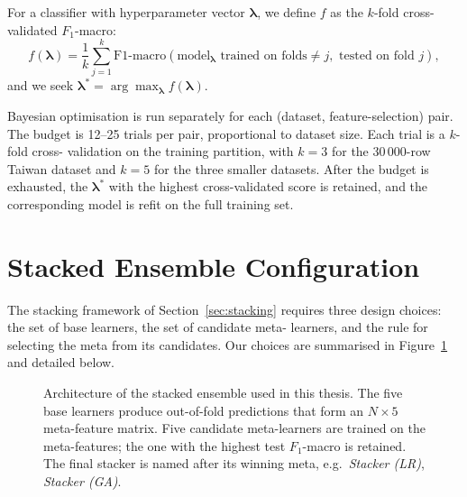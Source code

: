 For a classifier with hyperparameter vector $\boldsymbol{\lambda}$,
we define $f$ as the $k$-fold cross-validated $F_1$-macro:
\begin{equation}
f(\boldsymbol{\lambda})
=
\frac{1}{k}
\sum_{j=1}^{k}
\text{F1-macro}\!\left(
\text{model}_{\boldsymbol{\lambda}}\text{ trained on folds}\neq j,
\text{ tested on fold }j
\right),
\tag{3.6}
\label{eq:bo-objective}
\end{equation}
and we seek $\boldsymbol{\lambda}^{*}=\arg\max_{\boldsymbol{\lambda}} f(\boldsymbol{\lambda})$.

Bayesian optimisation is run separately for each (dataset,
feature-selection) pair. The budget is 12--25 trials per pair,
proportional to dataset size. Each trial is a $k$-fold cross-
validation on the training partition, with $k=3$ for the
30\,000-row Taiwan dataset and $k=5$ for the three smaller
datasets. After the budget is exhausted, the
$\boldsymbol{\lambda}^{*}$ with the highest cross-validated score
is retained, and the corresponding model is refit on the full
training set.

\section{Stacked Ensemble Configuration}
\label{sec:stacker-config}

The stacking framework of Section~\ref{sec:stacking} requires three
design choices: the set of base learners, the set of candidate meta-
learners, and the rule for selecting the meta from its candidates.
Our choices are summarised in Figure~\ref{fig:stacker} and
detailed below.

\begin{figure}[ht]
\centering
{}
\caption{Architecture of the stacked ensemble used in this thesis.
The five base learners produce out-of-fold predictions that form an
$N\times 5$ meta-feature matrix. Five candidate meta-learners are
trained on the meta-features; the one with the highest test
$F_1$-macro is retained. The final stacker is named after its
winning meta, e.g.\ \emph{Stacker (LR)}, \emph{Stacker (GA)}.}
\singlespacing
\label{fig:stacker}
\end{figure}

